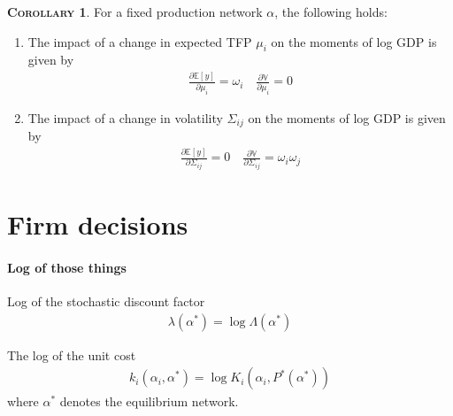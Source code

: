 \documentclass[11pt]{article}
\theoremstyle{definition}
\newtheorem{cor}{\noindent \textbf{\textsc{Corollary}}}
\begin{document}
	
	\begin{cor}
		For a fixed production network $\alpha$, the following holds:
		\begin{enumerate}[leftmargin=1cm, label=\arabic*.]
			\item The impact of a change in expected TFP $\mu_i$ on the moments of log GDP is given by
			\begin{align*}
				\frac{\partial\mathbb{E}[y]}{\partial \mu_i} = \omega_i \quad \frac{\partial \mathbb{V}}{\partial\mu_i} = 0
			\end{align*}
			\item The impact of a change in volatility $\Sigma_{ij}$ on the moments of log GDP is given by
			\begin{align*}
				\frac{\partial\mathbb{E}[y]}{\partial \Sigma_{ij}} = 0 \quad \frac{\partial \mathbb{V}}{\partial\Sigma_{ij}} = \omega_i\omega_j
			\end{align*}
		\end{enumerate}
	\end{cor}
	
	
	\section{Firm decisions}
	\paragraph{Log of those things}
	Log of the stochastic discount factor
	\begin{align*}
		\lambda(\alpha^*) = \log\Lambda(\alpha^*)
	\end{align*}
	
	The log of the unit cost
	\begin{align*}
		k_i(\alpha_i,\alpha^*) = \log K_i(\alpha_i, P^*(\alpha^*))
	\end{align*}
	where $\alpha^*$ denotes the equilibrium network.
	
\end{document}
